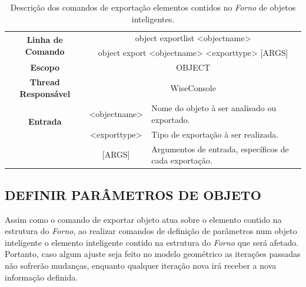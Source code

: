 \begin{center}
	\begin{table}[!htbp]
		\begin{tabular}{|c|c|m{}|}
			\hline
			\multirow{2}{*}{\textbf{Linha de Comando}} & \multicolumn{2}{c|}{object export\underline{\space\space}list <object\underline{\space\space}name>} \\
			& \multicolumn{2}{c|}{object export <object\underline{\space\space}name> <export\underline{\space\space}type> [ARGS]} \\
			\hline
			\textbf{Escopo} & \multicolumn{2}{c|}{OBJECT} \\
			\hline
			\textbf{Thread Responsável} & \multicolumn{2}{c|}{WiseConsole} \\
			\hline
			\multirow{2}{*}{\textbf{Entrada}} &  <object\underline{\space\space}name> & Nome do objeto à ser analisado ou exportado. \\
			&  <export\underline{\space\space}type> & Tipo de exportação à ser realizada. \\
			&  [ARGS] & Argumentos de entrada, específicos de cada exportação. \\
			\hline
		\end{tabular}
		\caption{Descrição dos comandos de exportação elementos contidos no \textit{Forno} de objetos inteligentes.}
		\label{tab:export_object}
	\end{table}
\end{center}

\subsection{DEFINIR PARÂMETROS DE OBJETO}\label{sec:set_field_object}

Assim como o comando de exportar objeto atua sobre o elemento contido na estrutura do \textit{Forno}, ao realizar comandos de definição de parâmetros num objeto inteligente o elemento inteligente contido na estrutura do \textit{Forno} que será afetado. Portanto, caso algum ajuste seja feito no modelo geométrico as iterações passadas não sofrerão mudanças, enquanto qualquer iteração nova irá receber a nova informação definida.

